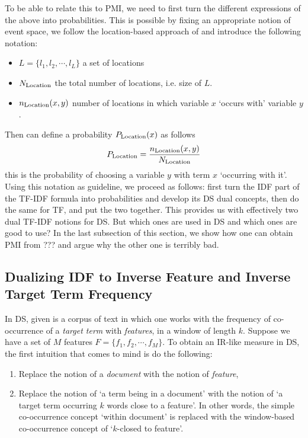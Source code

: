 To be able to relate this to PMI, we need to first turn the different expressions of the above into probabilities.  This is possible by fixing an appropriate notion of event space, we follow the location-based approach of \cite{ThomasBook} and introduce the following notation:

\begin{itemize}
\item $L = \{l_1, l_2, \cdots, l_L\}$ a set of locations
\item $N_{\textmd{Location}}$ the total number of locations, i.e. size  of $L$.
\item $n_{\textmd{Location}} (x,y)$ number of locations in which variable $x$ `occurs with' variable $y$.
\end{itemize}

Then can define a probability $P_{\textmd{Location}}(x)$ as follows
\[
P_{\textmd{Location}} = \frac{n_{\textmd{Location}}(x,y)}{N_{\textmd{Location}}}
\]
 this is  the probability of choosing a variable $y$ with term $x$ `occurring with it'.  Using this notation as guideline, we proceed as follows:   first turn the IDF part of the TF-IDF formula into probabilities and develop its DS dual concepts, then do the same for TF, and  put the two together.  This provides us with effectively two dual TF-IDF notions for DS.  But which ones are used in DS and which ones are good to use? In the last subsection of this section, we show how one can obtain PMI from ??? and argue why the other  one is terribly bad. 


\subsection{Dualizing  IDF to Inverse Feature  and Inverse Target Term Frequency }
\label{subsec-IDF}


\medskip
In DS, given is a corpus of text in which one works with the frequency of co-occurrence of a \emph{target term} with \emph{features}, in a window of length $k$.  Suppose we have a set of  $M$ features  $F = \{f_1, f_2, \cdots, f_M\}$.  To obtain an IR-like measure in DS, the first intuition that comes to mind is do the following:

\begin{enumerate}
\item   Replace the notion of a  \emph{document}  with the notion of  \emph{feature}, 
\item  Replace the notion of `a term being in a document'  with the notion of `a target  term occurring $k$ words close to a feature'.  In other words,  the  simple co-occurrence concept `within document' is replaced with the window-based co-occurrence concept of  `$k$-closed to feature'. 
\end{enumerate}

